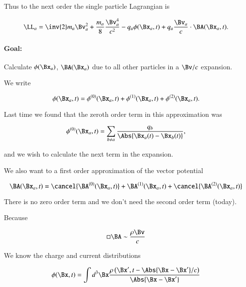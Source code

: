 Thus to the next order the single particle Lagrangian is

\begin{equation}\label{eqn:relativisticElectrodynamicsL25:110}
\LL_a = \inv{2} m_a \Bv_a^2 + \frac{m_a}{8} \frac{\Bv_a^4}{c^2} - q_a \phi(\Bx_a, t) + q_a \frac{\Bv_a}{c} \cdot \BA(\Bx_a, t).
\end{equation}

\paragraph{Goal:} Calculate $\phi(\Bx_a)$, $\BA(\Bx_a)$ due to all other particles in a $\Bv/c$ expansion.

We write

\begin{equation}\label{eqn:relativisticElectrodynamicsL25:130}
\phi(\Bx_a, t) = 
\phi^{(0)}(\Bx_a, t)
+\phi^{(1)}(\Bx_a, t)
+\phi^{(2)}(\Bx_a, t).
\end{equation}

Last time we found that the zeroth order term in this approximation was

\begin{equation}\label{eqn:relativisticElectrodynamicsL25:150}
\phi^{(0)}(\Bx_a, t) = \sum_{b \ne a} \frac{q_b}{\Abs{\Bx_a(t) - \Bx_b(t)}},
\end{equation}

and we wish to calculate the next term in the expansion.

We also want to a first order approximation of the vector potential

\begin{equation}\label{eqn:relativisticElectrodynamicsL25:170}
\BA(\Bx_a, t) = 
\cancel{\BA^{(0)}(\Bx_a, t)}
+\BA^{(1)}(\Bx_a, t)
+\cancel{\BA^{(2)}(\Bx_a, t)}
\end{equation}

There is no zero order term and we don't need the second order term (today).

Because

\begin{equation}\label{eqn:relativisticElectrodynamicsL25:190}
\square \BA \sim \frac{\rho \Bv}{c}
\end{equation}

We know the charge and current distributions

\begin{equation}\label{eqn:relativisticElectrodynamicsL25:210}
\phi(\Bx, t) = \int d^3 \Bx \frac{\rho\left(\Bx', t - \Abs{\Bx - \Bx'}/c\right)}{\Abs{\Bx - \Bx'}}
\end{equation}

